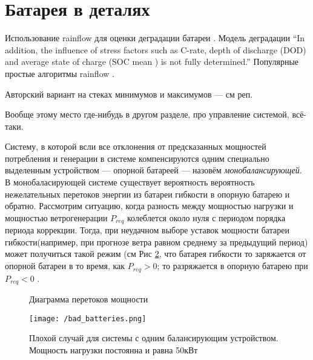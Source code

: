 \section{Батарея в деталях}

Использование rainflow для оценки деградации батареи \cite{xu2016modeling}.
Модель деградации \cite{laresgoiti2015modeling} ``In addition, the
influence of stress factors such as C-rate, depth of discharge (DOD)
and average state of charge (SOC mean ) is not fully determined.''
Популярные простые алгоритмы rainflow \cite{downing1982simple}.

Авторский вариант на стеках минимумов и максимумов --- см реп.


Вообще этому место где-нибудь в другом разделе, про управление системой, всё-таки.

Систему, в которой всли все отклонения от предсказанных мощностей потребления и генерации в системе компенсируются одним специально выделенным устройством --- опорной батареей --- назовём \textit{монобалансирующей}.
В монобаласирующей системе существует вероятность вероятность нежелательных перетоков энергии из батареи гибкости в опорную батарею и обратно.
Рассмотрим ситуацию, когда разность между мощностью нагрузки и мощностью ветрогенерации $P_{req}$  колеблется около нуля с периодом порядка периода коррекции. 
Тогда, при неудачном выборе уставок мощности батареи гибкости(например, при прогнозе ветра равном среднему за предыдущий период) может получиться такой режим (см Рис \ref{fig:bad_batteries}, что батарея гибкости то заряжается от опорной батареи в то время, как $P_{req} > 0$; то разряжается в опорную батарею при $P_{req} < 0$ .

\begin{figure}[]
\centering
\caption{Диаграмма перетоков мощности}
\label{fig:power_flow_graph}
\end{figure}

\begin{figure}[]
\texttt{[image: /bad\_batteries.png]}
\centering
\caption{Плохой случай для системы с одним балансирующим устройством. Мощность нагрузки постоянна и равна 50кВт}
\label{fig:bad_batteries}
\end{figure}

